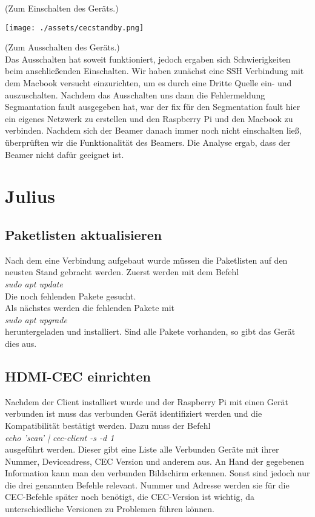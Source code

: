 \documentclass[a4paper]{article}
\begin{document}
(Zum Einschalten des Geräts.)

\begin{center}
\texttt{[image: ./assets/cecstandby.png]}
\end{center}

(Zum Ausschalten des Geräts.) \\

Das Ausschalten hat soweit funktioniert, jedoch ergaben sich Schwierigkeiten beim anschließenden Einschalten. Wir haben zunächst eine SSH Verbindung mit dem Macbook versucht einzurichten, um es durch eine Dritte Quelle ein- und auszuschalten. Nachdem das Ausschalten uns dann die Fehlermeldung Segmantation fault ausgegeben hat, war der fix für den Segmentation fault hier ein eigenes Netzwerk zu erstellen und den Raspberry Pi und den Macbook zu verbinden. Nachdem sich der Beamer danach immer noch nicht einschalten ließ, überprüften wir die Funktionalität des Beamers. Die Analyse ergab, dass der Beamer  nicht  dafür geeignet ist.

\clearpage

\section{Julius}
\subsection{Paketlisten aktualisieren}
Nach dem eine Verbindung aufgebaut wurde müssen die Paketlisten auf den neusten Stand gebracht werden.
Zuerst werden mit dem Befehl \\
\textsl{sudo apt update}\\
Die noch fehlenden Pakete gesucht.\\
Als nächstes werden die fehlenden Pakete mit \\
\textsl{sudo apt upgrade}\\
heruntergeladen und installiert. Sind alle Pakete vorhanden, so gibt das Gerät dies aus.
\subsection{HDMI-CEC einrichten}
Nachdem der Client installiert wurde und der Raspberry Pi mit einen Gerät verbunden ist muss das verbunden Gerät identifiziert werden und die Kompatibilität bestätigt werden.
Dazu muss der Befehl\\
\textsl{echo 'scan' | cec-client -s -d 1}\\
ausgeführt werden. Dieser gibt eine Liste alle Verbunden Geräte mit ihrer Nummer, Deviceadress, CEC Version und anderem aus. An Hand der gegebenen Information kann man den verbunden Bildschirm erkennen. Sonst sind jedoch nur die drei genannten Befehle relevant. Nummer und Adresse werden sie für die CEC-Befehle später noch benötigt, die CEC-Version ist wichtig, da unterschiedliche Versionen zu Problemen führen können.
\end{document}
